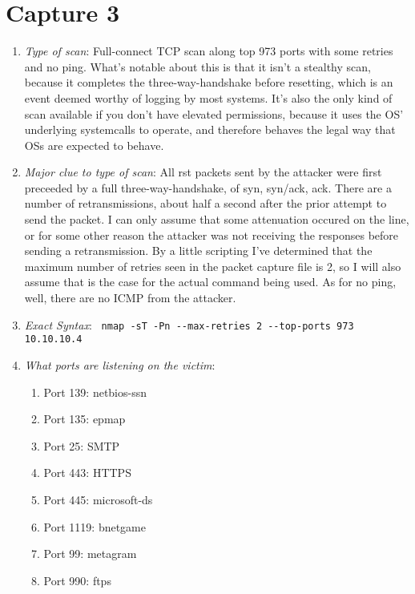 \documentclass{article}
\begin{document}
\section{Capture 3}
\begin{enumerate}
	\item {\em Type of scan}: Full-connect TCP scan along top 973 ports with
		some retries and no ping. What's notable about this is that it isn't a
		stealthy scan, because it completes the three-way-handshake
		before resetting, which is an event deemed worthy of logging by
		most systems. It's also the only kind of scan available if you
		don't have elevated permissions, because it uses the OS'
		underlying systemcalls to operate, and therefore behaves the
		legal way that OSs are expected to behave.
	\item {\em Major clue to type of scan}: All rst packets sent by the attacker
		were first preceeded by a full three-way-handshake, of syn,
		syn/ack, ack. There are a number of retransmissions, about half
		a second after the prior attempt to send the packet. I can only
		assume that some attenuation occured on the line, or for some
		other reason the attacker was not receiving the responses
		before sending a retransmission. By a little scripting I've
		determined that the maximum number of retries seen in the
		packet capture file is 2, so I will also assume that is the
		case for the actual command being used. As for no ping, well, there are no ICMP from the attacker.
	\item {\em Exact Syntax}: \verb| nmap -sT -Pn --max-retries 2 --top-ports 973 10.10.10.4 |
	\item {\em What ports are listening on the victim}:
		\begin{enumerate}
			\item Port 139: netbios-ssn
			\item Port 135: epmap
			\item Port 25: SMTP
			\item Port 443: HTTPS
			\item Port 445: microsoft-ds
			\item Port 1119: bnetgame
			\item Port 99: metagram
			\item Port 990: ftps
		\end{enumerate}
\end{enumerate}
\end{document}
